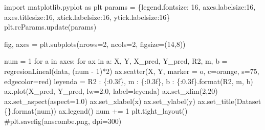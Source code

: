\documentclass[
  letterpaper,
  DIV=11,
  numbers=noendperiod]{scrreprt}
\newenvironment{Shaded}{\begin{snugshade}}{\end{snugshade}}
\newcommand{\BuiltInTok}[1]{\textcolor[rgb]{0.00,0.23,0.31}{#1}}
\newcommand{\CommentTok}[1]{\textcolor[rgb]{0.37,0.37,0.37}{#1}}
\newcommand{\ControlFlowTok}[1]{\textcolor[rgb]{0.00,0.23,0.31}{#1}}
\newcommand{\DecValTok}[1]{\textcolor[rgb]{0.68,0.00,0.00}{#1}}
\newcommand{\FloatTok}[1]{\textcolor[rgb]{0.68,0.00,0.00}{#1}}
\newcommand{\ImportTok}[1]{\textcolor[rgb]{0.00,0.46,0.62}{#1}}
\newcommand{\KeywordTok}[1]{\textcolor[rgb]{0.00,0.23,0.31}{#1}}
\newcommand{\NormalTok}[1]{\textcolor[rgb]{0.00,0.23,0.31}{#1}}
\newcommand{\OperatorTok}[1]{\textcolor[rgb]{0.37,0.37,0.37}{#1}}
\newcommand{\SpecialCharTok}[1]{\textcolor[rgb]{0.37,0.37,0.37}{#1}}
\newcommand{\StringTok}[1]{\textcolor[rgb]{0.13,0.47,0.30}{#1}}
\begin{document}
\begin{Shaded}
\begin{Highlighting}[]
\ImportTok{import}\NormalTok{ matplotlib.pyplot }\ImportTok{as}\NormalTok{ plt}
\NormalTok{params }\OperatorTok{=}\NormalTok{ \{}\StringTok{\textquotesingle{}legend.fontsize\textquotesingle{}}\NormalTok{: }\DecValTok{16}\NormalTok{,}
         \StringTok{\textquotesingle{}axes.labelsize\textquotesingle{}}\NormalTok{:}\DecValTok{16}\NormalTok{,}
         \StringTok{\textquotesingle{}axes.titlesize\textquotesingle{}}\NormalTok{:}\DecValTok{16}\NormalTok{,}
         \StringTok{\textquotesingle{}xtick.labelsize\textquotesingle{}}\NormalTok{:}\DecValTok{16}\NormalTok{,}
         \StringTok{\textquotesingle{}ytick.labelsize\textquotesingle{}}\NormalTok{:}\DecValTok{16}\NormalTok{\}}
\NormalTok{plt.rcParams.update(params)}

\NormalTok{fig, axes }\OperatorTok{=}\NormalTok{ plt.subplots(nrows}\OperatorTok{=}\DecValTok{2}\NormalTok{, ncols}\OperatorTok{=}\DecValTok{2}\NormalTok{, figsize}\OperatorTok{=}\NormalTok{(}\DecValTok{14}\NormalTok{,}\DecValTok{8}\NormalTok{))}

\NormalTok{num }\OperatorTok{=} \DecValTok{1}
\ControlFlowTok{for}\NormalTok{ a }\KeywordTok{in}\NormalTok{ axes:}
    \ControlFlowTok{for}\NormalTok{ ax }\KeywordTok{in}\NormalTok{ a:}
\NormalTok{        X, Y, X\_pred, Y\_pred, R2, m, b }\OperatorTok{=}\NormalTok{ regresionLineal(data, (num }\OperatorTok{{-}} \DecValTok{1}\NormalTok{)}\OperatorTok{*}\DecValTok{2}\NormalTok{)}
\NormalTok{        ax.scatter(X, Y, marker }\OperatorTok{=} \StringTok{\textquotesingle{}o\textquotesingle{}}\NormalTok{, c}\OperatorTok{=}\StringTok{\textquotesingle{}orange\textquotesingle{}}\NormalTok{, s}\OperatorTok{=}\DecValTok{75}\NormalTok{, edgecolor}\OperatorTok{=}\StringTok{\textquotesingle{}red\textquotesingle{}}\NormalTok{)}
\NormalTok{        leyenda }\OperatorTok{=} \StringTok{\textquotesingle{}R2 : }\SpecialCharTok{\{:0.3f\}}\StringTok{, m : }\SpecialCharTok{\{:0.3f\}}\StringTok{, b : }\SpecialCharTok{\{:0.3f\}}\StringTok{\textquotesingle{}}\NormalTok{.}\BuiltInTok{format}\NormalTok{(R2, m, b)}
\NormalTok{        ax.plot(X\_pred, Y\_pred, lw}\OperatorTok{=}\FloatTok{2.0}\NormalTok{, label}\OperatorTok{=}\NormalTok{leyenda)}
\NormalTok{        ax.set\_xlim(}\DecValTok{2}\NormalTok{,}\DecValTok{20}\NormalTok{)}
\NormalTok{        ax.set\_aspect(aspect}\OperatorTok{=}\FloatTok{1.0}\NormalTok{)}
\NormalTok{        ax.set\_xlabel(}\StringTok{\textquotesingle{}x\textquotesingle{}}\NormalTok{)}
\NormalTok{        ax.set\_ylabel(}\StringTok{\textquotesingle{}y\textquotesingle{}}\NormalTok{)}
\NormalTok{        ax.set\_title(}\StringTok{\textquotesingle{}Dataset }\SpecialCharTok{\{\}}\StringTok{\textquotesingle{}}\NormalTok{.}\BuiltInTok{format}\NormalTok{(num))}
\NormalTok{        ax.legend()}
\NormalTok{        num }\OperatorTok{+=} \DecValTok{1}
\NormalTok{plt.tight\_layout()}
\CommentTok{\#plt.savefig(\textquotesingle{}anscombe.png\textquotesingle{}, dpi=300)}
\end{Highlighting}
\end{Shaded}
\end{document}
